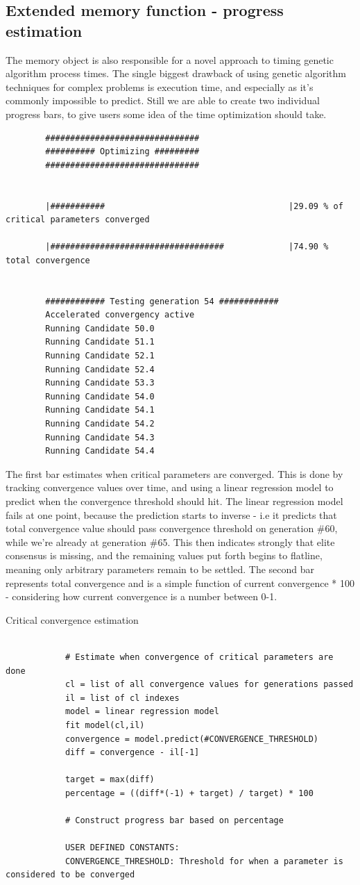 \documentclass[a4paper,english]{report}
\begin{document}
		\subsection{Extended memory function - progress estimation}
		The memory object is also responsible for a novel approach to timing genetic algorithm process times. The single biggest drawback of using genetic algorithm techniques for complex problems is execution time, and especially as it's commonly impossible to predict. Still we are able to create two individual progress bars, to give users some idea of the time optimization should take.
		\scriptsize
		\begin{verbatim}
		###############################
		########## Optimizing #########
		###############################
		
		
		|###########                                     |29.09 % of critical parameters converged
		
		|###################################             |74.90 % total convergence
		
		
		############ Testing generation 54 ############
		Accelerated convergency active
		Running Candidate 50.0
		Running Candidate 51.1
		Running Candidate 52.1
		Running Candidate 52.4
		Running Candidate 53.3
		Running Candidate 54.0
		Running Candidate 54.1
		Running Candidate 54.2
		Running Candidate 54.3
		Running Candidate 54.4

		\end{verbatim}
		\normalsize
		The first bar estimates when critical parameters are converged. This is done by tracking convergence values over time, and using a linear regression model to predict when the convergence threshold should hit. The linear regression model fails at one point, because the prediction starts to inverse - i.e it predicts that total convergence value should pass convergence threshold on generation \#60, while we're already at generation \#65. This then indicates strongly that elite consensus is missing, and the remaining values put forth begins to flatline, meaning only arbitrary parameters remain to be settled. The second bar represents total convergence and is a simple function of current convergence * 100 - considering how current convergence is a number between 0-1.
		\begin{algorithm}
			\caption{Critical convergence estimation}\label{algo:critical_convergence}
			\scriptsize
			\begin{verbatim}
			
			# Estimate when convergence of critical parameters are done
			cl = list of all convergence values for generations passed
			il = list of cl indexes
			model = linear regression model
			fit model(cl,il)
			convergence = model.predict(#CONVERGENCE_THRESHOLD)
			diff = convergence - il[-1]
			
			target = max(diff)
			percentage = ((diff*(-1) + target) / target) * 100
			
			# Construct progress bar based on percentage
			
			USER DEFINED CONSTANTS:
			CONVERGENCE_THRESHOLD: Threshold for when a parameter is considered to be converged
			
			\end{verbatim}
		\end{algorithm}
\end{document}

